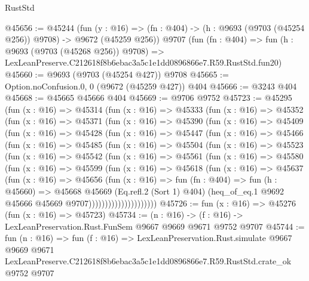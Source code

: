 \begin{lexlean}{RustStd}
\begin{coremodule}
@45656 := @45244
    (fun (y : @16) => (fn : @404) -> (h : @9693 (@9703 (@45254 @256)) @9708) -> @9672 (@45259 @256))
    @9707
    (fun (fn : @404) =>
    fun (h : @9693 (@9703 (@45268 @256)) @9708) =>
    LexLeanPreserve.C212618f8b6ebac3a5c1e1dd0896866e7.R59.RustStd.fun20)
@45660 := @9693 (@9703 (@45254 @427)) @9708
@45665 := Option.noConfusion.{0, 0} (@9672 (@45259 @427)) @404
@45666 := @3243 @404
@45668 := @45665 @45666 @404
@45669 := @9706 @9752
@45723 := @45295
    (fun (x : @16) =>
    @45314
      (fun (x : @16) =>
      @45333
        (fun (x : @16) =>
        @45352
          (fun (x : @16) =>
          @45371
            (fun (x : @16) =>
            @45390
              (fun (x : @16) =>
              @45409
                (fun (x : @16) =>
                @45428
                  (fun (x : @16) =>
                  @45447
                    (fun (x : @16) =>
                    @45466
                      (fun (x : @16) =>
                      @45485
                        (fun (x : @16) =>
                        @45504
                          (fun (x : @16) =>
                          @45523
                            (fun (x : @16) =>
                            @45542
                              (fun (x : @16) =>
                              @45561
                                (fun (x : @16) =>
                                @45580
                                  (fun (x : @16) =>
                                  @45599
                                    (fun (x : @16) =>
                                    @45618
                                      (fun (x : @16) =>
                                      @45637
                                        (fun (x : @16) =>
                                        @45656
                                          (fun (x : @16) =>
                                          fun (fn : @404) =>
                                          fun (h : @45660) =>
                                          @45668
                                            @45669
                                            (Eq.refl.{2} (Sort 1) @404)
                                            (heq_of_eq.{1}
                                              @9692
                                              @45666
                                              @45669
                                              @9707)))))))))))))))))))))
@45726 := fun (x : @16) => @45276 (fun (x : @16) => @45723)
@45734 := (n : @16) -> (f : @16) -> LexLeanPreservation.Rust.FunSem @9667 @9669 @9671 @9752 @9707
@45744 := fun (n : @16) =>
  fun (f : @16) =>
  LexLeanPreservation.Rust.simulate
    @9667
    @9669
    @9671
    LexLeanPreserve.C212618f8b6ebac3a5c1e1dd0896866e7.R59.RustStd.crate_ok
    @9752
    @9707
\end{coremodule}
\end{lexlean}
